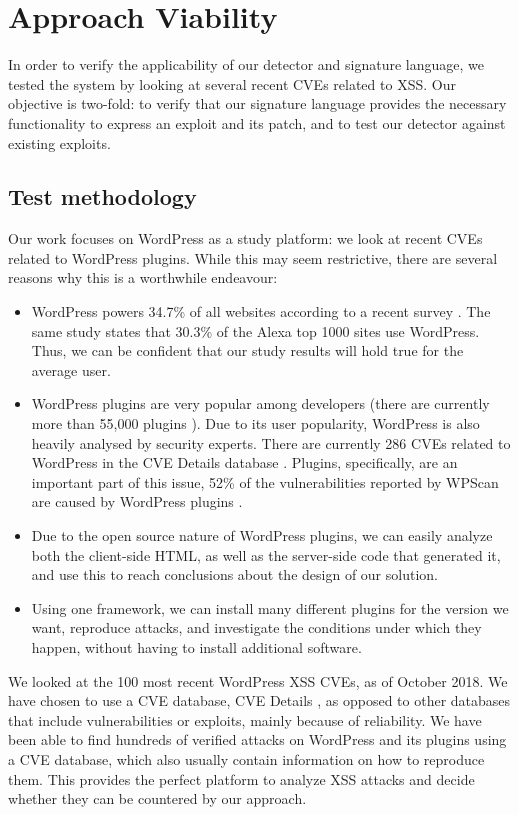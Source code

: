 \section{Approach Viability} \label{viability}

In order to verify the applicability of our detector and signature language, we tested the system by looking at several recent CVEs related to \ac{XSS}. Our objective is two-fold: to verify that our signature language provides the necessary functionality to express an exploit and its patch, and to test our detector against existing exploits.

\subsection{Test methodology} \label{methodology}

Our work focuses on WordPress as a study platform: we look at recent CVEs related to WordPress plugins. While this may seem restrictive, there are several reasons why this is a worthwhile endeavour:
\begin{itemize}
	\item WordPress powers 34.7\% of all websites according to a recent survey  \cite{w3stats}. The same study states that 30.3\% of the Alexa top 1000 sites use WordPress. Thus, we can be confident that our study results will hold true for the average user.
	\item WordPress plugins are very popular among developers (there are currently more than 55,000 plugins \cite{wpplugins}). Due to its user popularity, WordPress is also heavily analysed by security experts. There are currently 286 CVEs related to WordPress in the CVE Details database \cite{cvedetails}. Plugins, specifically, are an important part of this issue, 52\% of the vulnerabilities reported by WPScan are caused by WordPress plugins \cite{wpscan}.
	\item Due to the open source nature of WordPress plugins, we can easily analyze both the client-side HTML, as well as the server-side code that generated it, and use this to reach conclusions about the design of our solution.
	\item Using one framework, we can install many different plugins for the version we want, reproduce attacks, and investigate the conditions under which they happen, without having to install additional software.
\end{itemize}

We looked at the 100 most recent WordPress \ac{XSS} CVEs, as of October 2018. We have chosen to use a CVE database, CVE Details \cite{cvedetails}, as opposed to other databases that include vulnerabilities or exploits, mainly because of reliability. We have been able to find hundreds of verified attacks on WordPress and its plugins using a CVE database, which also usually contain information on how to reproduce them. This provides the perfect platform to analyze \ac{XSS} attacks and decide whether they can be countered by our approach. 

